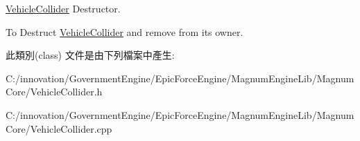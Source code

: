 \hyperlink{class_i_dream_sky_1_1_vehicle_collider}{Vehicle\+Collider} Destructor. 

To Destruct \hyperlink{class_i_dream_sky_1_1_vehicle_collider}{Vehicle\+Collider} and remove from its owner. 

此類別(class) 文件是由下列檔案中產生\+:\begin{DoxyCompactItemize}
\item 
C\+:/innovation/\+Government\+Engine/\+Epic\+Force\+Engine/\+Magnum\+Engine\+Lib/\+Magnum\+Core/Vehicle\+Collider.\+h\item 
C\+:/innovation/\+Government\+Engine/\+Epic\+Force\+Engine/\+Magnum\+Engine\+Lib/\+Magnum\+Core/Vehicle\+Collider.\+cpp\end{DoxyCompactItemize}
